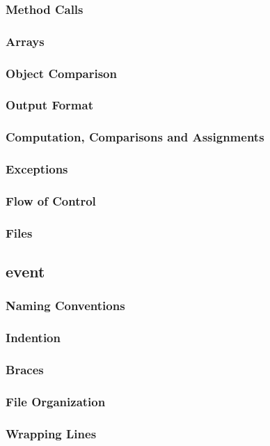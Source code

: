 \documentclass{article}
\begin{document}
\subsubsection{Method Calls}
\subsubsection{Arrays}
\subsubsection{Object Comparison}
\subsubsection{Output Format}
\subsubsection{Computation, Comparisons and Assignments}
\subsubsection{Exceptions}
\subsubsection{Flow of Control}
\subsubsection{Files}

\subsection{event}

\subsubsection{Naming Conventions}
\subsubsection{Indention}
\subsubsection{Braces}
\subsubsection{File Organization}
\subsubsection{Wrapping Lines}
\end{document}
